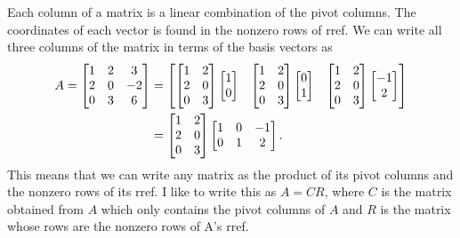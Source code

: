 \begin{example}
{Each column of a matrix is a linear combination of the pivot columns.  The coordinates of each vector is found in the nonzero rows of rref.
}
We can write all three columns of the matrix in terms of the basis vectors as 
\begin{align*}
A=\begin{bmatrix}
\begin{matrix} 1\\2\\0 \end{matrix}
&\begin{matrix} 2\\0\\3 \end{matrix}
&\begin{matrix} 3\\-2\\6 \end{matrix}
\end{bmatrix}
&=
\begin{bmatrix}
\begin{bmatrix}\begin{matrix} 1\\2\\0 \end{matrix}&\begin{matrix} 2\\0\\3 \end{matrix}\end{bmatrix}\begin{bmatrix}1\\0\end{bmatrix}&
\begin{bmatrix}\begin{matrix} 1\\2\\0 \end{matrix}&\begin{matrix} 2\\0\\3 \end{matrix}\end{bmatrix}\begin{bmatrix}0\\1\end{bmatrix}&
\begin{bmatrix}\begin{matrix} 1\\2\\0 \end{matrix}&\begin{matrix} 2\\0\\3 \end{matrix}\end{bmatrix}\begin{bmatrix}-1\\2\end{bmatrix}
\end{bmatrix}
\\
&=
\begin{bmatrix}
\begin{matrix} 1\\2\\0 \end{matrix}
&\begin{matrix} 2\\0\\3 \end{matrix}
\end{bmatrix}
\begin{bmatrix}
\begin{matrix} 1\\0 \end{matrix}
&\begin{matrix} 0\\1 \end{matrix}
&\begin{matrix} -1\\2 \end{matrix}
\end{bmatrix}.
\end{align*}
This means that we can write any matrix as the product of its pivot columns and the nonzero rows of its rref. I like to write this as $A=CR$, where $C$ is the matrix obtained from $A$ which only contains the pivot columns of $A$ and $R$ is the matrix whose rows are the nonzero rows of A's rref.


\end{example}
